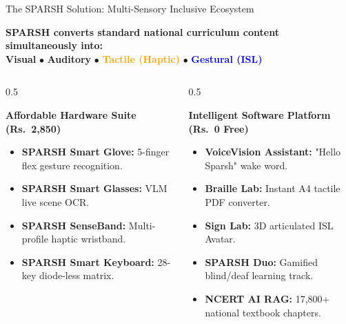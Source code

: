 \documentclass[aspectratio=169,10pt]{beamer}
\begin{document}
\begin{frame}{The SPARSH Solution: Multi-Sensory Inclusive Ecosystem}
    \begin{center}
        \textbf{SPARSH converts standard national curriculum content simultaneously into:}\\[0.2cm]
        \textbf{\textcolor{sparshPurple}{Visual}} \quad $\bullet$ \quad 
        \textbf{\textcolor{sparshTeal}{Auditory}} \quad $\bullet$ \quad 
        \textbf{\textcolor{orange}{Tactile (Haptic)}} \quad $\bullet$ \quad 
        \textbf{\textcolor{blue}{Gestural (ISL)}}
    \end{center}
    \vspace{0.2cm}
    \begin{columns}[T]
        \begin{column}{0.5\textwidth}
            \begin{block}{\textbf{Affordable Hardware Suite (Rs.~2,850)}}
                \begin{itemize}
                    \item \textbf{SPARSH Smart Glove:} 5-finger flex gesture recognition.
                    \item \textbf{SPARSH Smart Glasses:} VLM live scene OCR.
                    \item \textbf{SPARSH SenseBand:} Multi-profile haptic wristband.
                    \item \textbf{SPARSH Smart Keyboard:} 28-key diode-less matrix.
                \end{itemize}
            \end{block}
        \end{column}
        \begin{column}{0.5\textwidth}
            \begin{block}{\textbf{Intelligent Software Platform (Rs.~0 Free)}}
                \begin{itemize}
                    \item \textbf{VoiceVision Assistant:} "Hello Sparsh" wake word.
                    \item \textbf{Braille Lab:} Instant A4 tactile PDF converter.
                    \item \textbf{Sign Lab:} 3D articulated ISL Avatar.
                    \item \textbf{SPARSH Duo:} Gamified blind/deaf learning track.
                    \item \textbf{NCERT AI RAG:} 17,800+ national textbook chapters.
                \end{itemize}
            \end{block}
        \end{column}
    \end{columns}
\end{frame}
\end{document}
